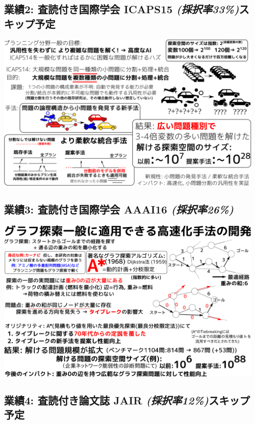 \subsection[業績2: 査読付き国際学会 ICAPS15 \textbf{\emph{(採択率33\%)}}]{業績2: 査読付き国際学会 ICAPS15 \textbf{\emph{(採択率33\%)}}\hfill{}\textsc{スキップ予定}}
\label{sec:orgheadline21}

\includegraphics{img/assemble-keps14-icaps15.png}

\subsection{業績3: 査読付き国際学会 AAAI16 \textbf{\emph{(採択率26\%)}}}
\label{sec:orgheadline22}

\includegraphics{img/aaai16.png}

\subsection[業績4: 査読付き論文誌 JAIR \textbf{\emph{(採択率12\%)}}]{業績4: 査読付き論文誌 JAIR \textbf{\emph{(採択率12\%)}}\hfill{}\textsc{スキップ予定}}
\label{sec:orgheadline23}

